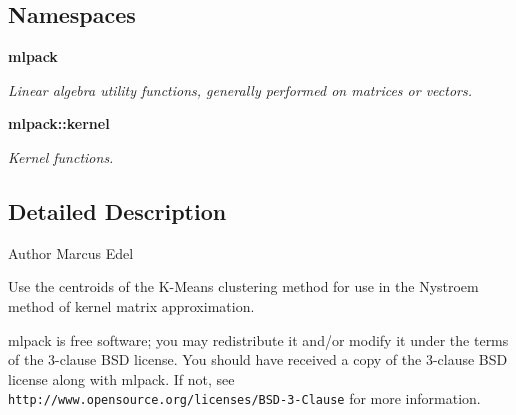 \subsection*{Namespaces}
\begin{DoxyCompactItemize}
\item 
 {\bf mlpack}
\begin{DoxyCompactList}\small\item\em Linear algebra utility functions, generally performed on matrices or vectors. \end{DoxyCompactList}\item 
 {\bf mlpack\+::kernel}
\begin{DoxyCompactList}\small\item\em Kernel functions. \end{DoxyCompactList}\end{DoxyCompactItemize}


\subsection{Detailed Description}
\begin{DoxyAuthor}{Author}
Marcus Edel
\end{DoxyAuthor}
Use the centroids of the K-\/\+Means clustering method for use in the Nystroem method of kernel matrix approximation.

mlpack is free software; you may redistribute it and/or modify it under the terms of the 3-\/clause B\+SD license. You should have received a copy of the 3-\/clause B\+SD license along with mlpack. If not, see {\tt http\+://www.\+opensource.\+org/licenses/\+B\+S\+D-\/3-\/\+Clause} for more information. 